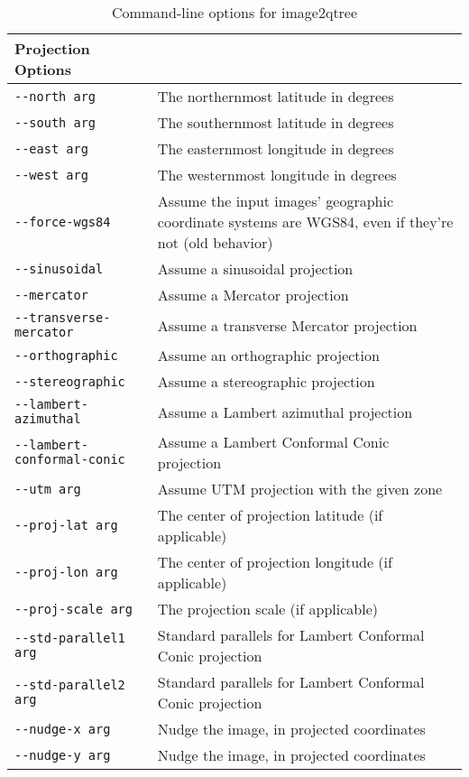 \begin{table}
\begin{tabular}{|l|l|}
Projection Options\\ \hline
\verb#--north arg# & The northernmost latitude in degrees\\ \hline
\verb#--south arg# & The southernmost latitude in degrees\\ \hline
\verb#--east arg# & The easternmost longitude in degrees\\ \hline
\verb#--west arg# & The westernmost longitude in degrees\\ \hline
\verb#--force-wgs84# & Assume the input images' geographic coordinate systems are WGS84, even if they're not (old behavior)\\ \hline
\verb#--sinusoidal# & Assume a sinusoidal projection\\ \hline
\verb#--mercator# & Assume a Mercator projection\\ \hline
\verb#--transverse-mercator# & Assume a transverse Mercator projection\\ \hline
\verb#--orthographic# & Assume an orthographic projection\\ \hline
\verb#--stereographic# & Assume a stereographic projection\\ \hline
\verb#--lambert-azimuthal# & Assume a Lambert azimuthal projection\\ \hline
\verb#--lambert-conformal-conic# & Assume a Lambert Conformal Conic projection\\ \hline
\verb#--utm arg# & Assume UTM projection with the given zone\\ \hline
\verb#--proj-lat arg# & The center of projection latitude (if applicable)\\ \hline
\verb#--proj-lon arg# & The center of projection longitude (if applicable)\\ \hline
\verb#--proj-scale arg# & The projection scale (if applicable)\\ \hline
\verb#--std-parallel1 arg# & Standard parallels for Lambert Conformal Conic projection\\ \hline
\verb#--std-parallel2 arg# & Standard parallels for Lambert Conformal Conic projection\\ \hline
\verb#--nudge-x arg# & Nudge the image, in projected coordinates\\ \hline
\verb#--nudge-y arg# & Nudge the image, in projected coordinates\\ \hline
\end{tabular}
\caption{Command-line options for image2qtree}
\label{tbl:image2qtree}
\end{table}
